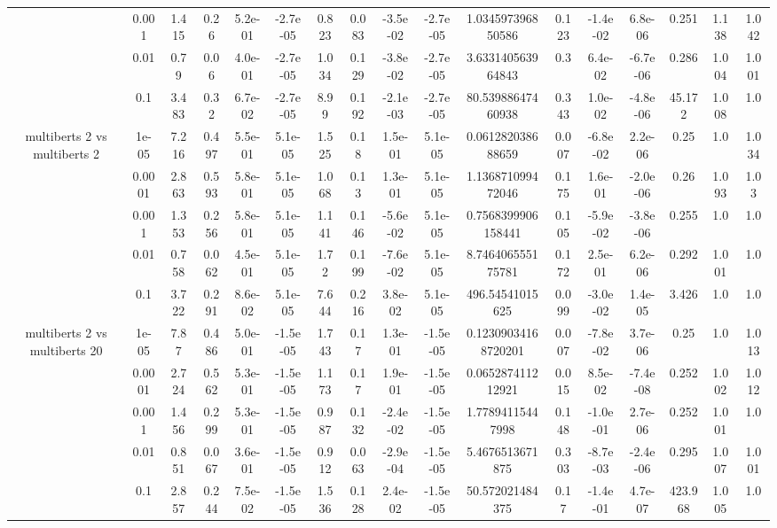 \begin{tabular}{|c|c|c|c|c|c|c|c|c|c|c|c|c|c|c|c|c|}
 & 0.001 & 1.415 & 0.26 & 5.2e-01 & -2.7e-05 & 0.823 & 0.083 & -3.5e-02 & -2.7e-05 & 1.034597396850586 & 0.123 & -1.4e-02 & 6.8e-06 & 0.251 & 1.138 & 1.042 \\
 & 0.01 & 0.79 & 0.06 & 4.0e-01 & -2.7e-05 & 1.034 & 0.129 & -3.8e-02 & -2.7e-05 & 3.633140563964843 & 0.3 & 6.4e-02 & -6.7e-06 & 0.286 & 1.004 & 1.001 \\
 & 0.1 & 3.483 & 0.32 & 6.7e-02 & -2.7e-05 & 8.99 & 0.192 & -2.1e-03 & -2.7e-05 & 80.53988647460938 & 0.343 & 1.0e-02 & -4.8e-06 & 45.172 & 1.008 & 1.0 \\
\hline
\multirow{5}{*}{multiberts 2 vs multiberts 2} & 1e-05 & 7.216 & 0.497 & 5.5e-01 & 5.1e-05 & 1.525 & 0.18 & 1.5e-01 & 5.1e-05 & 0.061282038688659 & 0.007 & -6.8e-02 & 2.2e-06 & 0.25 & 1.0 & 1.034 \\
 & 0.0001 & 2.863 & 0.593 & 5.8e-01 & 5.1e-05 & 1.068 & 0.13 & 1.3e-01 & 5.1e-05 & 1.136871099472046 & 0.175 & 1.6e-01 & -2.0e-06 & 0.26 & 1.093 & 1.03 \\
 & 0.001 & 1.353 & 0.256 & 5.8e-01 & 5.1e-05 & 1.141 & 0.146 & -5.6e-02 & 5.1e-05 & 0.7568399906158441 & 0.105 & -5.9e-02 & -3.8e-06 & 0.255 & 1.0 & 1.0 \\
 & 0.01 & 0.758 & 0.062 & 4.5e-01 & 5.1e-05 & 1.72 & 0.199 & -7.6e-02 & 5.1e-05 & 8.746406555175781 & 0.172 & 2.5e-01 & 6.2e-06 & 0.292 & 1.001 & 1.0 \\
 & 0.1 & 3.722 & 0.291 & 8.6e-02 & 5.1e-05 & 7.644 & 0.216 & 3.8e-02 & 5.1e-05 & 496.54541015625 & 0.099 & -3.0e-02 & 1.4e-05 & 3.426 & 1.0 & 1.0 \\
\hline
\multirow{5}{*}{multiberts 2 vs multiberts 20} & 1e-05 & 7.87 & 0.486 & 5.0e-01 & -1.5e-05 & 1.743 & 0.17 & 1.3e-01 & -1.5e-05 & 0.12309034168720201 & 0.007 & -7.8e-02 & 3.7e-06 & 0.25 & 1.0 & 1.013 \\
 & 0.0001 & 2.724 & 0.562 & 5.3e-01 & -1.5e-05 & 1.173 & 0.17 & 1.9e-01 & -1.5e-05 & 0.065287411212921 & 0.015 & 8.5e-02 & -7.4e-08 & 0.252 & 1.002 & 1.012 \\
 & 0.001 & 1.456 & 0.299 & 5.3e-01 & -1.5e-05 & 0.987 & 0.132 & -2.4e-02 & -1.5e-05 & 1.77894115447998 & 0.148 & -1.0e-01 & 2.7e-06 & 0.252 & 1.001 & 1.0 \\
 & 0.01 & 0.851 & 0.067 & 3.6e-01 & -1.5e-05 & 0.912 & 0.063 & -2.9e-04 & -1.5e-05 & 5.4676513671875 & 0.303 & -8.7e-03 & -2.4e-06 & 0.295 & 1.007 & 1.001 \\
 & 0.1 & 2.857 & 0.244 & 7.5e-02 & -1.5e-05 & 1.536 & 0.128 & 2.4e-02 & -1.5e-05 & 50.572021484375 & 0.17 & -1.4e-01 & 4.7e-07 & 423.968 & 1.005 & 1.0 \\

\end{tabular}
